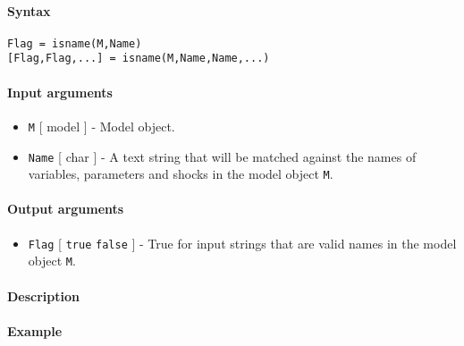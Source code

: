 


	\paragraph{Syntax}\label{syntax}

\begin{verbatim}
Flag = isname(M,Name)
[Flag,Flag,...] = isname(M,Name,Name,...)
\end{verbatim}

\paragraph{Input arguments}\label{input-arguments}

\begin{itemize}
\item
  \texttt{M} {[} model {]} - Model object.
\item
  \texttt{Name} {[} char {]} - A text string that will be matched
  against the names of variables, parameters and shocks in the model
  object \texttt{M}.
\end{itemize}

\paragraph{Output arguments}\label{output-arguments}

\begin{itemize}
\itemsep1pt\parskip0pt
\item
  \texttt{Flag} {[} \texttt{true} \textbar{} \texttt{false} {]} - True
  for input strings that are valid names in the model object \texttt{M}.
\end{itemize}

\paragraph{Description}\label{description}

\paragraph{Example}\label{example}


